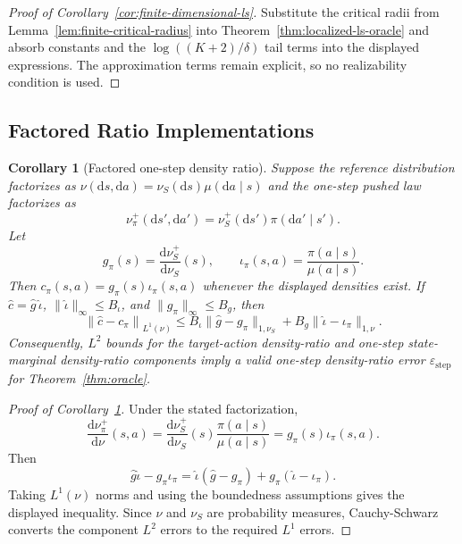 \documentclass{article}
\newcommand{\1}{\mathbf{1}}
\newcommand{\dd}{\mathrm{d}}
\newcommand{\nup}{\nu_\pi^+}
\newcommand{\cpi}{c_\pi}
\newcommand{\norm}[2][]{\left\lVert #2 \right\rVert_{#1}}
\newcommand{\LoneNu}[1]{\norm[L^1(\nu)]{#1}}
\theoremstyle{plain}
\newtheorem{corollary}[theorem]{Corollary}
\theoremstyle{definition}
\theoremstyle{remark}
\begin{document}
\begin{proof}[Proof of Corollary~\ref{cor:finite-dimensional-ls}]
Substitute the critical radii from Lemma~\ref{lem:finite-critical-radius} into Theorem~\ref{thm:localized-ls-oracle} and absorb constants and the $\log((K+2)/\delta)$ tail terms into the displayed expressions.
The approximation terms remain explicit, so no realizability condition is used.
\end{proof}

\subsection{Factored Ratio Implementations}
\label{app:rltools-mapping}

\begin{corollary}[Factored one-step density ratio]
\label{cor:factored-ratio}
Suppose the reference distribution factorizes as $\nu(\dd s,\dd a)=\nu_S(\dd s)\mu(\dd a\mid s)$ and the one-step pushed law factorizes as
\[
    \nup(\dd s',\dd a')
    =
    \nu_S^+(\dd s')\pi(\dd a'\mid s').
\]
Let
\[
    g_\pi(s)=\frac{\dd\nu_S^+}{\dd\nu_S}(s),
    \qquad
    \iota_\pi(s,a)=\frac{\pi(a\mid s)}{\mu(a\mid s)}.
\]
Then $\cpi(s,a)=g_\pi(s)\iota_\pi(s,a)$ whenever the displayed densities exist.
If $\widehat c=\widehat g\,\widehat\iota$, $\|\widehat\iota\|_\infty\le B_\iota$, and $\|g_\pi\|_\infty\le B_g$, then
\[
    \LoneNu{\widehat c-\cpi}
    \le
    B_\iota\|\widehat g-g_\pi\|_{1,\nu_S}
    +
    B_g\|\widehat\iota-\iota_\pi\|_{1,\nu}.
\]
Consequently, $L^2$ bounds for the target-action density-ratio and one-step state-marginal density-ratio components imply a valid one-step density-ratio error $\varepsilon_{\mathrm{step}}$ for Theorem~\ref{thm:oracle}.
\end{corollary}

\begin{proof}[Proof of Corollary~\ref{cor:factored-ratio}]
Under the stated factorization,
\[
    \frac{\dd\nup}{\dd\nu}(s,a)
    =
    \frac{\dd\nu_S^+}{\dd\nu_S}(s)
    \frac{\pi(a\mid s)}{\mu(a\mid s)}
    =
    g_\pi(s)\iota_\pi(s,a).
\]
Then
\[
    \widehat g\widehat\iota-g_\pi\iota_\pi
    =
    \widehat\iota(\widehat g-g_\pi)
    +
    g_\pi(\widehat\iota-\iota_\pi).
\]
Taking $L^1(\nu)$ norms and using the boundedness assumptions gives the displayed inequality.
Since $\nu$ and $\nu_S$ are probability measures, Cauchy-Schwarz converts the component $L^2$ errors to the required $L^1$ errors.
\end{proof}
\end{document}
